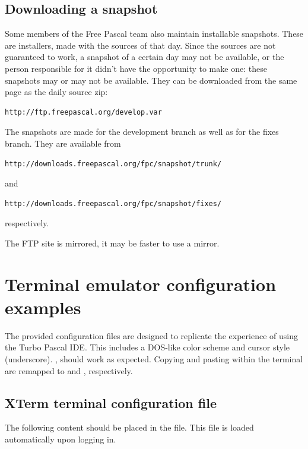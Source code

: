 \section{Downloading a snapshot}
Some members of the Free Pascal team also maintain installable snapshots.
These are installers, made with the sources of that day. Since the sources
are not guaranteed to work, a snapshot of a certain day may not be
available, or the person responsible for it didn't have the opportunity to
make one: these snapshots may or may not be available. They can be
downloaded from the same page as the daily source zip:
\begin{verbatim}
http://ftp.freepascal.org/develop.var
\end{verbatim}
The snapshots are made for the development branch as well as for the fixes
branch. They are available from
\begin{verbatim}
http://downloads.freepascal.org/fpc/snapshot/trunk/
\end{verbatim}
and
\begin{verbatim}
http://downloads.freepascal.org/fpc/snapshot/fixes/
\end{verbatim}
respectively.

The FTP site is mirrored, it may be faster to use a mirror.

\chapter{Terminal emulator configuration examples}
\label{ch:TerminalConfigExample}

The provided configuration files are designed to replicate the experience of
using the Turbo Pascal IDE. This includes a DOS-like color scheme and cursor
style (underscore). ,  should work as expected.
Copying and pasting within the terminal are remapped to  and
, respectively.

\section{XTerm terminal configuration file}

The following content should be placed in the  file.
This file is loaded automatically upon logging in.

